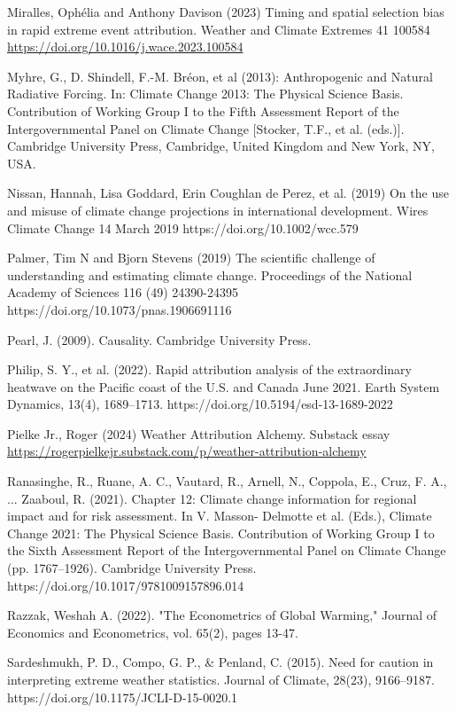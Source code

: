 \documentclass[12pt,paper=a4,DIV=12,parskip=never,chapterprefix=false,headings=standardclasses]{scrreprt}
\begin{document}
Miralles, Ophélia and Anthony Davison (2023) Timing and spatial selection bias in rapid extreme event
attribution. Weather and Climate Extremes 41 100584 \url{https://doi.org/10.1016/j.wace.2023.100584}

Myhre, G., D. Shindell, F.-M. Bréon, et al (2013): Anthropogenic and Natural Radiative Forcing. In:
Climate Change 2013: The Physical Science Basis. Contribution of Working Group I to the Fifth
Assessment Report of the Intergovernmental Panel on Climate Change [Stocker, T.F., et al. (eds.)].
Cambridge University Press, Cambridge, United Kingdom and New York, NY, USA.

Nissan, Hannah, Lisa Goddard, Erin Coughlan de Perez, et al. (2019) On the use and misuse of climate
change projections in international development. Wires Climate Change 14 March 2019
https://doi.org/10.1002/wcc.579

Palmer, Tim N and Bjorn Stevens (2019) The scientific challenge of understanding and estimating
climate change. Proceedings of the National Academy of Sciences 116 (49) 24390-24395
https://doi.org/10.1073/pnas.1906691116

Pearl, J. (2009). Causality. Cambridge University Press.

Philip, S. Y., et al. (2022). Rapid attribution analysis of the extraordinary heatwave on the Pacific coast of
the U.S. and Canada June 2021. Earth System Dynamics, 13(4), 1689–1713.
https://doi.org/10.5194/esd-13-1689-2022

Pielke Jr., Roger (2024) Weather Attribution Alchemy. Substack essay
\url{https://rogerpielkejr.substack.com/p/weather-attribution-alchemy}

Ranasinghe, R., Ruane, A. C., Vautard, R., Arnell, N., Coppola, E., Cruz, F. A., ... Zaaboul, R. (2021).
Chapter 12: Climate change information for regional impact and for risk assessment. In V. Masson-
Delmotte et al. (Eds.), Climate Change 2021: The Physical Science Basis. Contribution of Working
Group I to the Sixth Assessment Report of the Intergovernmental Panel on Climate Change (pp.
1767–1926). Cambridge University Press. https://doi.org/10.1017/9781009157896.014

Razzak, Weshah A. (2022). "The Econometrics of Global Warming," Journal of Economics and
Econometrics, vol. 65(2), pages 13-47.

Sardeshmukh, P. D., Compo, G. P., \& Penland, C. (2015). Need for caution in interpreting extreme
weather statistics. Journal of Climate, 28(23), 9166–9187. https://doi.org/10.1175/JCLI-D-15-0020.1
\end{document}
